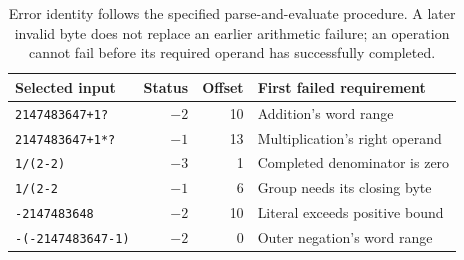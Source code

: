 \begin{table}[htbp]
  \centering
  \begin{tabular}{l r r l}
    \toprule
    Selected input            & Status & Offset & First failed requirement       \\
    \midrule
    \texttt{2147483647+1?}    & $-2$   & 10     & Addition's word range          \\
    \texttt{2147483647+1*?}   & $-1$   & 13     & Multiplication's right operand \\
    \texttt{1/(2-2)}          & $-3$   & 1      & Completed denominator is zero  \\
    \texttt{1/(2-2}           & $-1$   & 6      & Group needs its closing byte   \\
    \texttt{-2147483648}      & $-2$   & 10     & Literal exceeds positive bound \\
    \texttt{-(-2147483647-1)} & $-2$   & 0      & Outer negation's word range    \\
    \bottomrule
  \end{tabular}
  \caption{Error identity follows the specified parse-and-evaluate procedure. A later invalid byte does not replace an earlier arithmetic failure; an operation cannot fail before its required operand has successfully completed.}
  \label{tab:revision-expression-errors}
\end{table}
